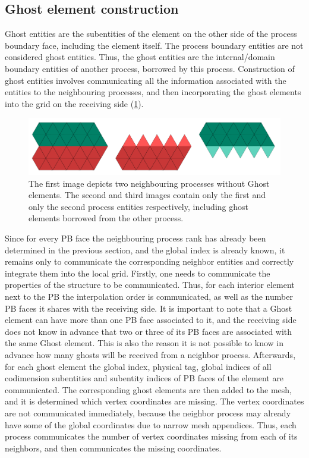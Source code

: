 \subsection{Ghost element construction}
\label{impl-grid-constructor-ghost}

\noindent
Ghost entities are the subentities of the element on the other side of the process boundary face, including the element itself. The process boundary entities are not considered ghost entities. Thus, the ghost entities are the internal/domain boundary entities of another process, borrowed by this process. Construction of ghost entities involves communicating all the information associated with the entities to the neighbouring processes, and then incorporating the ghost elements into the grid on the receiving side (\cref{fig:impl:ghostelements}). \\

\begin{figure}
    \centering
	\includegraphics[scale=0.5]{images/parallel-ghost-elements}
	\caption{The first image depicts two neighbouring processes without Ghost elements. The second and third images contain only the first and only the second process entities respectively, including ghost elements borrowed from the other process. }
	\label{fig:impl:ghostelements}
\end{figure}

\noindent
Since for every PB face the neighbouring process rank has already been determined in the previous section, and the global index is already known, it remains only to communicate the corresponding neighbor entities and correctly integrate them into the local grid. Firstly, one needs to communicate the properties of the structure to be communicated. Thus, for each interior element next to the PB the interpolation order is communicated, as well as the number PB faces it shares with the receiving side. It is important to note that a Ghost element can have more than one PB face associated to it, and the receiving side does not know in advance that two or three of its PB faces are associated with the same Ghost element. This is also the reason it is not possible to know in advance how many ghosts will be received from a neighbor process. Afterwards, for each ghost element the global index, physical tag, global indices of all codimension subentities and subentity indices of PB faces of the element are communicated. The corresponding ghost elements are then added to the mesh, and it is determined which vertex coordinates are missing. The vertex coordinates are not communicated immediately, because the neighbor process may already have some of the global coordinates due to narrow mesh appendices. Thus, each process communicates the number of vertex coordinates missing from each of its neighbors, and then communicates the missing coordinates.




